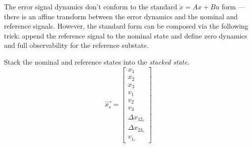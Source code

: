 \documentclass[12pt,onecolumn,reqno]{amsart}
\begin{document}
The error signal dynamics don't conform to the standard $\dot{x} = Ax + Bu$ form
--- there is an affine transform between the error dynamics and the nominal and
reference signals. However, the standard form can be composed via the following
trick: append the reference signal to the nominal state and define zero dynamics
and full observability for the reference substate.

Stack the nominal and reference states into the \textit{stacked state}.
\begin{equation}
  \vec{x_{s}} = 
  \begin{bmatrix}
    x_{1}             \\
    x_{2}             \\
    x_{3}             \\
    v_{1}             \\
    v_{2}             \\
    v_{3}             \\ 
    \Delta x_{12_{r}} \\
    \Delta x_{23_{r}} \\
    v_{1_{r}}
  \end{bmatrix}
\end{equation}
\end{document}
